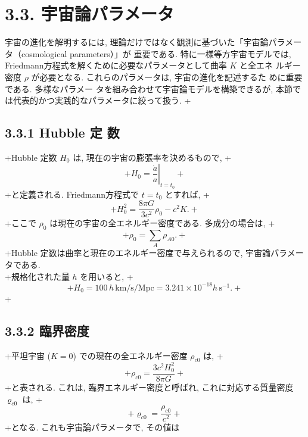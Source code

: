 \documentclass[a4paper,12pt]{article}
\begin{document}
\section*{3.3. 宇宙論パラメータ}
宇宙の進化を解明するには, 理論だけではなく観測に基づいた「宇宙論パラメータ（cosmological parameters）」が
重要である. 特に一様等方宇宙モデルでは, Friedmann方程式を解くために必要なパラメータとして曲率 $K$ と全エネ ルギー密度 $\rho$ が必要となる. これらのパラメータは, 宇宙の進化を記述するた
めに重要である. 多様なパラメー タを組み合わせて宇宙論モデルを構築できるが, 本節では代表的かつ実践的なパラメータに絞って扱う.              +\subsection*{3.3.1 Hubble 定
数}
+Hubble 定数 $H_0$ は, 現在の宇宙の膨張率を決めるもので,
+\begin{equation*}
+    H_0 = \left. \frac{\dot{a}}{a} \right|_{t = t_0} \tag{3.53}
+\end{equation*}
+と定義される. Friedmann方程式で $t = t_0$ とすれば,
+\begin{equation*}
+    H_0^2 = \frac{8 \pi G}{3c^2} \rho_{0} -c^2 K. \tag{3.54}
+\end{equation*}
+ここで $\rho_{0}$ は現在の宇宙の全エネルギー密度である. 多成分の場合は,
+\begin{equation*}
+    \rho_{0} = \sum_{A} \rho_{A0}. \tag{3.55}
+\end{equation*}
+Hubble 定数は曲率と現在のエネルギー密度で与えられるので, 宇宙論パラメータである.\\
+規格化された量 $h$ を用いると,
+\begin{equation*}
+    H_0 = 100\, h\, \text{km/s/Mpc} = 3.241 \times 10^{-18} h\, \text{s}^{-1}. \tag{3.56}
+\end{equation*}
+\subsection*{3.3.2 臨界密度}
+平坦宇宙 ($K = 0$) での現在の全エネルギー密度 $\rho_{c0}$ は,
+\begin{equation*}
+    \rho_{c0} = \frac{3 c^2H_0^2}{8 \pi G} \tag{3.57}
+\end{equation*}
+と表される. これは, 臨界エネルギー密度と呼ばれ, これに対応する質量密度 $\varrho_{c0}$ は,
+\begin{equation*}
+    \varrho_{c0} = \frac{\rho_{c0}}{c^2} \tag{3.58}
+\end{equation*}
+となる. これも宇宙論パラメータで, その値は
\end{document}
